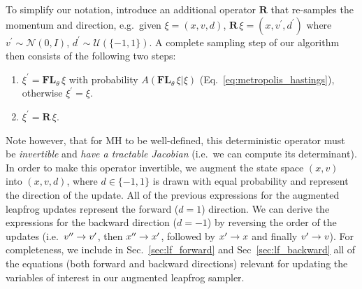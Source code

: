 \documentclass[../main.tex]{subfiles}
\begin{document}
To simplify our notation, introduce an additional operator $\mathbf{R}$ that
re-samples the momentum and direction, e.g.\ given $\xi = (x, v, d)$,
$\mathbf{R}\,\xi = (x, v^{\prime}, d^{\prime})$ where $v^{\prime} \sim
\mathcal{N}(0, I)$, $d^{\prime} \sim \mathcal{U}\left(\{-1, 1\}\right)$.
%
A complete sampling step of our algorithm then consists of the following two
steps:
%
\begin{enumerate}
    \item $\xi^{\prime} = \mathbf{FL}_{\theta} \,\xi$ with probability
        $A(\mathbf{FL}_{\theta}\,\xi|\xi)$ (Eq.~\ref{eq:metropolis_hastings}),
        otherwise $\xi^{\prime} = \xi$.
    \item $\xi^{\prime} = \mathbf{R}\,\xi$.
\end{enumerate}
%
Note however, that for MH to be well-defined, this deterministic operator must
be \emph{invertible} and \emph{have a tractable Jacobian} (i.e.\ we can compute
its determinant).
%
In order to make this operator invertible, we augment the state space $(x, v)$
into $(x, v, d)$, where $d \in \{-1, 1\}$ is drawn with equal probability and
represent the direction of the update.
%
All of the previous expressions for the augmented leapfrog updates represent
the forward ($d = 1$) direction.
%
We can derive the expressions for the backward direction ($d = -1$) by
reversing the order of the updates (i.e.\ ${v^{\prime\prime}} \rightarrow {v^{\prime}}$, then ${x^{\prime\prime}}
\rightarrow {x^{\prime}}$, followed by ${x^{\prime}} \rightarrow x$ and finally ${v^{\prime}} \rightarrow
v$).
%
For completeness, we include in Sec.~\ref{sec:lf_forward} and
Sec~\ref{sec:lf_backward} all of the equations (both forward and backward
directions) relevant for updating the variables of interest in our augmented
leapfrog sampler.

%
%
\end{document}
